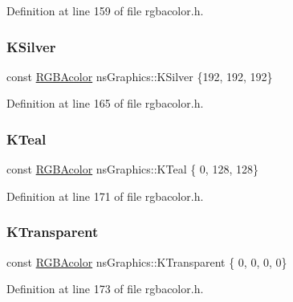 Definition at line 159 of file rgbacolor.\+h.

\mbox{\label{namespacens_graphics_a44884fe5a7841edbad80039e8ad4017c}} 
\subsubsection{\texorpdfstring{K\+Silver}{KSilver}}
{\footnotesize\ttfamily const \hyperlink{classns_graphics_1_1_r_g_b_acolor}{R\+G\+B\+Acolor} ns\+Graphics\+::\+K\+Silver \{192, 192, 192\}}



Definition at line 165 of file rgbacolor.\+h.

\mbox{\label{namespacens_graphics_a63e989cb02df1c3e6cbd40d0d3e3161d}} 
\subsubsection{\texorpdfstring{K\+Teal}{KTeal}}
{\footnotesize\ttfamily const \hyperlink{classns_graphics_1_1_r_g_b_acolor}{R\+G\+B\+Acolor} ns\+Graphics\+::\+K\+Teal \{ 0, 128, 128\}}



Definition at line 171 of file rgbacolor.\+h.

\mbox{\label{namespacens_graphics_ab2001ad03cceb2565849e04465618c1e}} 
\subsubsection{\texorpdfstring{K\+Transparent}{KTransparent}}
{\footnotesize\ttfamily const \hyperlink{classns_graphics_1_1_r_g_b_acolor}{R\+G\+B\+Acolor} ns\+Graphics\+::\+K\+Transparent \{ 0, 0, 0, 0\}}



Definition at line 173 of file rgbacolor.\+h.

\mbox{\label{namespacens_graphics_a8c5fcb477a548c6ed321748ec8383bb2}} 
